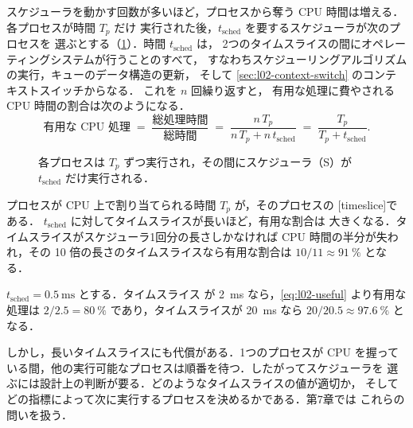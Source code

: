 \documentclass[../main.tex]{subfiles}
\begin{document}
スケジューラを動かす回数が多いほど，プロセスから奪う CPU 時間は増える．
各プロセスが時間 $T_p$ だけ
実行された後，$t_{\mathrm{sched}}$ を要するスケジューラが次のプロセスを
選ぶとする（\cref{fig:l02-timeslice}）．時間 $t_{\mathrm{sched}}$ は，
2つのタイムスライスの間にオペレーティングシステムが行うことのすべて，
すなわちスケジューリングアルゴリズムの実行，キューのデータ構造の更新，
そして \cref{sec:l02-context-switch} のコンテキストスイッチからなる．
これを $n$ 回繰り返すと，
有用な処理に費やされる CPU 時間の割合は次のようになる．
\begin{equation}
  \text{有用な CPU 処理}
  \;=\; \frac{\text{総処理時間}}{\text{総時間}}
  \;=\; \frac{n\,T_p}{n\,T_p + n\,t_{\mathrm{sched}}}
  \;=\; \frac{T_p}{T_p + t_{\mathrm{sched}}} .
  \label{eq:l02-useful}
\end{equation}

\begin{figure}[htbp]
  \centering
  
  \caption{各プロセスは $T_p$ ずつ実行され，その間にスケジューラ（S）が
    $t_{\mathrm{sched}}$ だけ実行される．}
  \label{fig:l02-timeslice}
\end{figure}

プロセスが CPU 上で割り当てられる時間 $T_p$ が，そのプロセスの
[timeslice]である．
$t_{\mathrm{sched}}$ に対してタイムスライスが長いほど，有用な割合は
大きくなる．タイムスライスがスケジューラ1回分の長さしかなければ CPU
時間の半分が失われ，その 10 倍の長さのタイムスライスなら有用な割合は
$10/11 \approx \SI{91}{\percent}$ となる．

\begin{example}
  $t_{\mathrm{sched}} = \SI{0.5}{\milli\second}$ とする．タイムスライス
  が \SI{2}{\milli\second} なら，\cref{eq:l02-useful} より有用な処理は
  $2/2.5 = \SI{80}{\percent}$ であり，タイムスライスが
  \SI{20}{\milli\second} なら $20/20.5 \approx \SI{97.6}{\percent}$ と
  なる．
\end{example}

しかし，長いタイムスライスにも代償がある．1つのプロセスが CPU を握って
いる間，他の実行可能なプロセスは順番を待つ．したがってスケジューラを
選ぶには設計上の判断が要る．どのようなタイムスライスの値が適切か，
そしてどの指標によって次に実行するプロセスを決めるかである．第7章では
これらの問いを扱う．
\end{document}
